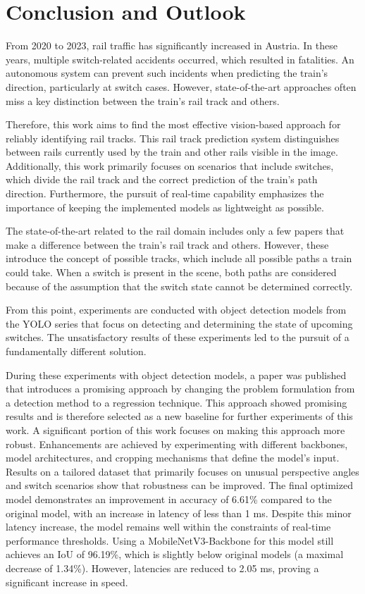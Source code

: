 \clearpage
\chapter{Conclusion and Outlook}
\label{sec:conclusionAndOutlook}

From 2020 to 2023, rail traffic has significantly increased in Austria.
In these years, multiple switch-related accidents occurred, which resulted in fatalities.
An autonomous system can prevent such incidents when predicting the train's direction, particularly at switch cases.
However, state-of-the-art approaches often miss a key distinction between the train's rail track and others.

Therefore, this work aims to find the most effective vision-based approach for reliably identifying rail tracks.
This rail track prediction system distinguishes between rails currently used by the train and other rails visible in the image.
Additionally, this work primarily focuses on scenarios that include switches, which divide the rail track and the correct prediction of the train's path direction.
Furthermore, the pursuit of real-time capability emphasizes the importance of keeping the implemented models as lightweight as possible.

The state-of-the-art related to the rail domain includes only a few papers that make a difference between the train's rail track and others.
However, these introduce the concept of possible tracks, which include all possible paths a train could take.
When a switch is present in the scene, both paths are considered because of the assumption that the switch state cannot be determined correctly.

From this point, experiments are conducted with object detection models from the \ac{YOLO} series that focus on detecting and determining the state of upcoming switches.
The unsatisfactory results of these experiments led to the pursuit of a fundamentally different solution.

During these experiments with object detection models, a paper was published that introduces a promising approach by changing the problem formulation from a detection method to a regression technique.
This approach showed promising results and is therefore selected as a new baseline for further experiments of this work.
A significant portion of this work focuses on making this approach more robust.
Enhancements are achieved by experimenting with different backbones, model architectures, and cropping mechanisms that define the model's input.
Results on a tailored dataset that primarily focuses on unusual perspective angles and switch scenarios show that robustness can be improved.
The final optimized model demonstrates an improvement in accuracy of 6.61\% compared to the original model, with an increase in latency of less than 1 ms.
Despite this minor latency increase, the model remains well within the constraints of real-time performance thresholds.
Using a MobileNetV3-Backbone for this model still achieves an \ac{IoU} of 96.19\%, which is slightly below original models (a maximal decrease of 1.34\%).
However, latencies are reduced to 2.05 ms, proving a significant increase in speed. 

